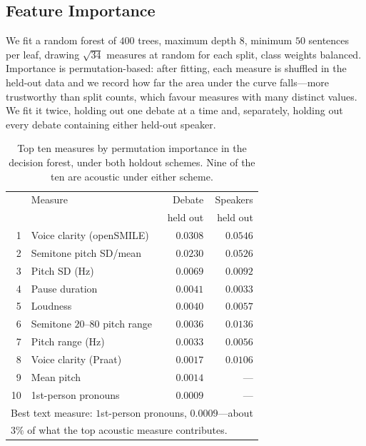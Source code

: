 \documentclass[journal]{IEEEtran}
\begin{document}
\subsection{Feature Importance}
\label{sec:method:forest}

We fit a random forest of $400$ trees, maximum depth $8$, minimum $50$
sentences per leaf, drawing $\sqrt{34}$ measures at random for each split,
class weights balanced. Importance is permutation-based: after fitting, each
measure is shuffled in the held-out data and we record how far the area
under the curve falls---more trustworthy than split counts, which favour
measures with many distinct values. We fit it twice, holding out one debate
at a time and, separately, holding out every debate containing either
held-out speaker.

\begin{table}[t]
\caption{Top ten measures by permutation importance in the decision forest,
under both holdout schemes. Nine of the ten are acoustic under either scheme.}
\label{tab:forest}
\centering
\footnotesize
\setlength{\tabcolsep}{3pt}
\begin{tabular}{rlrr}
\toprule
 & Measure & Debate & Speakers \\
 &         & held out & held out \\
\midrule
1  & Voice clarity (openSMILE)      & $0.0308$ & $0.0546$ \\
2  & Semitone pitch SD/mean         & $0.0230$ & $0.0526$ \\
3  & Pitch SD (Hz)                  & $0.0069$ & $0.0092$ \\
4  & Pause duration                 & $0.0041$ & $0.0033$ \\
5  & Loudness                       & $0.0040$ & $0.0057$ \\
6  & Semitone $20$--$80$ pitch range & $0.0036$ & $0.0136$ \\
7  & Pitch range (Hz)               & $0.0033$ & $0.0056$ \\
8  & Voice clarity (Praat)          & $0.0017$ & $0.0106$ \\
9  & Mean pitch                     & $0.0014$ & --- \\
10 & 1st-person pronouns            & $0.0009$ & --- \\
\midrule
\multicolumn{4}{l}{Best text measure: $1$st-person pronouns, $0.0009$---about} \\
\multicolumn{4}{l}{$3\%$ of what the top acoustic measure contributes.} \\
\bottomrule
\end{tabular}
\end{table}
\end{document}
